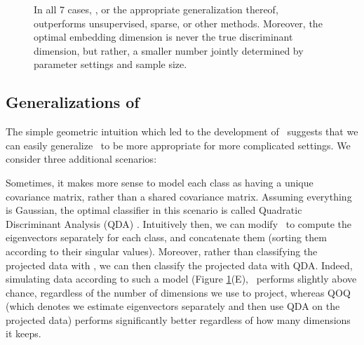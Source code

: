 \documentclass[10pt]{article}
\begin{document}
\begin{figure}[h!]
{%
In all 7 cases, \Lol, or the appropriate generalization thereof, outperforms unsupervised, sparse, or other methods.  Moreover, the optimal embedding dimension is never the true discriminant dimension, but rather, a smaller number jointly determined by parameter settings and sample size.
}
\label{fig:properties}
\end{figure}



\subsection*{Generalizations of \Lol}

The simple geometric intuition which led to the development of \Lol~suggests that we can easily generalize \Lol~to be more appropriate for more complicated settings. We consider three additional scenarios:

 Sometimes, it makes more sense to model each class as having a unique covariance matrix, rather than a shared covariance matrix.  Assuming everything is Gaussian, the optimal classifier in this scenario is called  Quadratic Discriminant Analysis (QDA) \cite{Hastie2004}.  Intuitively then, we can modify \Lol~to compute the eigenvectors separately for each class, and concatenate them (sorting them according to their singular values).  Moreover, rather than classifying the projected data with \Lda, we can then classify the projected data with QDA.  Indeed, simulating data according to such a model (Figure \ref{fig:properties}(E), \Lol~performs slightly above chance, regardless of the number of dimensions we use to project, whereas QOQ (which denotes we estimate eigenvectors separately and then use QDA on the projected data) performs significantly better regardless of how many dimensions it keeps.
\end{document}
